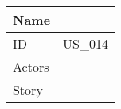 \documentclass{article}
\newcommand\addrow[2]{#1 &#2\\ }
\newcommand\tabularhead{\begin{tabular}{lp{8cm}}
		\hline
	}
\newenvironment{usecase}{\tabularhead}
	{\hline\end{tabular}}
\begin{document}
	\begin{usecase}
		\addrow{Name}{  }
		\hline
		\addrow{ID}{US\_014}
		\hline
 		\addrow{Actors}{    }
		\hline		
		\addrow{Story}{ }
								

	\end{usecase}
	
\end{document}
